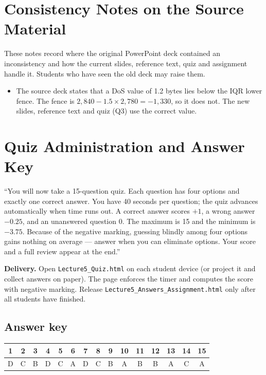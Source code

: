 \documentclass[11pt]{article}
\begin{document}
\section{Consistency Notes on the Source Material}These notes record where the original PowerPoint deck contained an inconsistency and how the current slides, reference text, quiz and assignment handle it. Students who have seen the old deck may raise them.\begin{itemize}\item The source deck states that a DoS value of 1.2 bytes lies below the IQR lower fence. The fence is $2{,}840-1.5\times2{,}780=-1{,}330$, so it does not. The new slides, reference text and quiz (Q3) use the correct value.\end{itemize}

\section{Quiz Administration and Answer Key}

\begin{sayit}``You will now take a 15-question quiz. Each question has four options and exactly one correct answer. You have 40 seconds per question; the quiz advances automatically when time runs out. A correct answer scores $+1$, a wrong answer $-0.25$, and an unanswered question 0. The maximum is 15 and the minimum is $-3.75$. Because of the negative marking, guessing blindly among four options gains nothing on average --- answer when you can eliminate options. Your score and a full review appear at the end.''\end{sayit}

\textbf{Delivery.} Open \texttt{Lecture5\_Quiz.html} on each student device (or project it and collect answers on paper). The page enforces the timer and computes the score with negative marking. Release \texttt{Lecture5\_Answers\_Assignment.html} only after all students have finished.

\subsection*{Answer key}\begin{center}\small\renewcommand{\arraystretch}{1.3}\begin{tabular}{|c|c|c|c|c|c|c|c|c|c|c|c|c|c|c|}\hline \textbf{1} & \textbf{2} & \textbf{3} & \textbf{4} & \textbf{5} & \textbf{6} & \textbf{7} & \textbf{8} & \textbf{9} & \textbf{10} & \textbf{11} & \textbf{12} & \textbf{13} & \textbf{14} & \textbf{15}\\\hline D & C & B & D & C & A & D & C & B & A & B & B & A & C & A\\\hline\end{tabular}\end{center}
\end{document}
